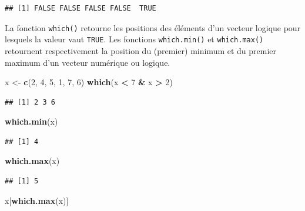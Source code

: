 \documentclass[
  11pt,
]{book}
\newenvironment{Shaded}{\begin{snugshade}}{\end{snugshade}}
\newcommand{\DecValTok}[1]{\textcolor[rgb]{0.00,0.00,0.81}{#1}}
\newcommand{\KeywordTok}[1]{\textcolor[rgb]{0.13,0.29,0.53}{\textbf{#1}}}
\newcommand{\NormalTok}[1]{#1}
\newcommand{\OperatorTok}[1]{\textcolor[rgb]{0.81,0.36,0.00}{\textbf{#1}}}
\newcommand{\StringTok}[1]{\textcolor[rgb]{0.31,0.60,0.02}{#1}}
\numberwithin{equation}{section}
\numberwithin{countremarque}{section}
\begin{document}
\begin{lstlisting}
## [1] FALSE FALSE FALSE FALSE  TRUE
\end{lstlisting}

La fonction \texttt{which()} retourne les positions des éléments d'un vecteur logique pour lesquels la valeur vaut \texttt{TRUE}. Les fonctions \texttt{which.min()} et \texttt{which.max()} retournent respectivement la position du (premier) minimum et du premier maximum d'un vecteur numérique ou logique.

\begin{Shaded}
\begin{Highlighting}[]
\NormalTok{x \textless{}{-}}\StringTok{ }\KeywordTok{c}\NormalTok{(}\DecValTok{2}\NormalTok{, }\DecValTok{4}\NormalTok{, }\DecValTok{5}\NormalTok{, }\DecValTok{1}\NormalTok{, }\DecValTok{7}\NormalTok{, }\DecValTok{6}\NormalTok{)}
\KeywordTok{which}\NormalTok{(x }\OperatorTok{\textless{}}\StringTok{ }\DecValTok{7} \OperatorTok{\&}\StringTok{ }\NormalTok{x }\OperatorTok{\textgreater{}}\StringTok{ }\DecValTok{2}\NormalTok{)}
\end{Highlighting}
\end{Shaded}

\begin{lstlisting}
## [1] 2 3 6
\end{lstlisting}

\begin{Shaded}
\begin{Highlighting}[]
\KeywordTok{which.min}\NormalTok{(x)}
\end{Highlighting}
\end{Shaded}

\begin{lstlisting}
## [1] 4
\end{lstlisting}

\begin{Shaded}
\begin{Highlighting}[]
\KeywordTok{which.max}\NormalTok{(x)}
\end{Highlighting}
\end{Shaded}

\begin{lstlisting}
## [1] 5
\end{lstlisting}

\begin{Shaded}
\begin{Highlighting}[]
\NormalTok{x[}\KeywordTok{which.max}\NormalTok{(x)]}
\end{Highlighting}
\end{Shaded}
\end{document}
